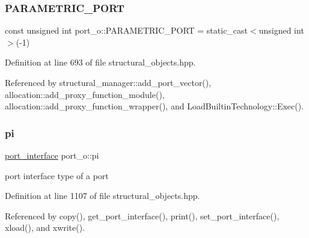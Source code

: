\subsubsection{\texorpdfstring{P\+A\+R\+A\+M\+E\+T\+R\+I\+C\+\_\+\+P\+O\+RT}{PARAMETRIC\_PORT}}
{\footnotesize\ttfamily const unsigned int port\+\_\+o\+::\+P\+A\+R\+A\+M\+E\+T\+R\+I\+C\+\_\+\+P\+O\+RT = static\+\_\+cast$<$unsigned int$>$(-\/1)\hspace{0.3cm}{\ttfamily [static]}}



Definition at line 693 of file structural\+\_\+objects.\+hpp.



Referenced by structural\+\_\+manager\+::add\+\_\+port\+\_\+vector(), allocation\+::add\+\_\+proxy\+\_\+function\+\_\+module(), allocation\+::add\+\_\+proxy\+\_\+function\+\_\+wrapper(), and Load\+Builtin\+Technology\+::\+Exec().

\mbox{\label{structport__o_ae8736b3b15c2828aa9908d25781d028e}} 
\subsubsection{\texorpdfstring{pi}{pi}}
{\footnotesize\ttfamily \hyperlink{structport__o_a37d2e6a450aea997028478f5bfb4e1f6}{port\+\_\+interface} port\+\_\+o\+::pi\hspace{0.3cm}{\ttfamily [private]}}



port interface type of a port 



Definition at line 1107 of file structural\+\_\+objects.\+hpp.



Referenced by copy(), get\+\_\+port\+\_\+interface(), print(), set\+\_\+port\+\_\+interface(), xload(), and xwrite().

\mbox{\label{structport__o_a6644ea0b57dc6845b90dd585a04c978e}} 
